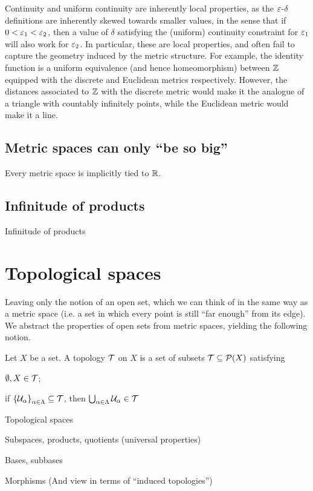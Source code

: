 \documentclass[11pt]{article}
\begin{document}
Continuity and uniform continuity are inherently local properties, as the $\varepsilon$-$\delta$ definitions are inherently skewed towards smaller values, in the sense that if $0 < \varepsilon_1 < \varepsilon_2$, then a value of $\delta$ satisfying the (uniform) continuity constraint for $\varepsilon_1$ will also work for $\varepsilon_2$. In particular, these are local properties, and often fail to capture the geometry induced by the metric structure. For example, the identity function is a uniform equivalence (and hence homeomorphism) between $\mathbb{Z}$ equipped with the discrete and Euclidean metrics respectively. However, the distances associated to $\mathbb{Z}$ with the discrete metric would make it the analogue of a triangle with countably infinitely points, while the Euclidean metric would make it a line.

\subsection{Metric spaces can only ``be so big''}
Every metric space is implicitly tied to $\mathbb{R}$.
\subsection{Infinitude of products}
Infinitude of products

\section{Topological spaces}
Leaving only the notion of an open set, which we can think of in the same way as a metric space (i.e. a set in which every point is still ``far enough'' from its edge). We abstract the properties of open sets from metric spaces, yielding the following notion.
\begin{definition}
    Let $X$ be a set. A topology $\mathcal{T}$ on $X$ is a set of subsets $\mathcal{T} \subseteq \mathcal{P}(X)$ satisfying
    \begin{enum}
        \item $\emptyset, X \in \mathcal{T}$;
        \item if $\left\{  \mathcal{U}_\alpha  \right\}_{\alpha \in \Lambda} \subseteq \mathcal{T}$, then $\bigcup_{\alpha \in \Lambda} \mathcal{U}_\alpha \in \mathcal{T}$
    \end{enum}
\end{definition}

Topological spaces

Subspaces, products, quotients (universal properties)

Bases, subbases

Morphisms (And view in terms of ``induced topologies'')
\end{document}

